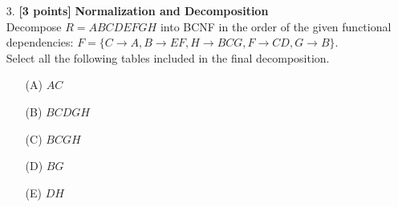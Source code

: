 \documentclass[10pt]{article}
\begin{document}
\begin{enumerate}
    \item[3.] \textbf{[3 points]} \textbf{Normalization and Decomposition} \\
        Decompose $R=ABCDEFGH$ into BCNF in the order of the given functional dependencies: $F=\{ C\rightarrow A, B\rightarrow EF, H\rightarrow BCG, F\rightarrow CD, G\rightarrow B\}$.\\
        Select all the following tables included in the final decomposition.
        \begin{enumerate}
            \item[(A)] $AC$ \\
            \item[(B)] $BCDGH$ \\
            \item[(C)] $BCGH$ \\
            \item[(D)] $BG$ \\
            \item[(E)] $DH$ \\ \\ \\ \\
        \end{enumerate}
\end{enumerate}




\newpage
\end{document}
